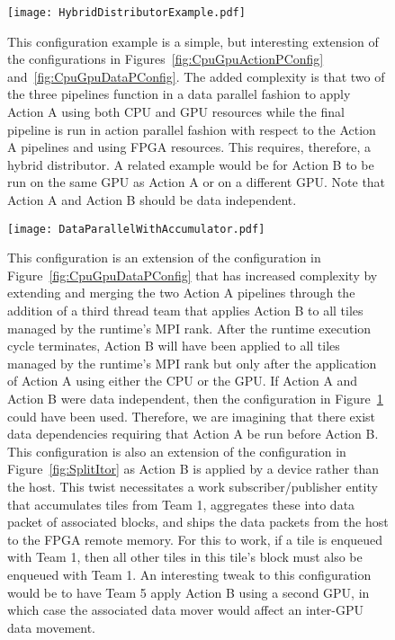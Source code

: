 \documentclass{article}
\begin{document}
\begin{appendices}
\begin{figure}[!hp]
\begin{center}
\texttt{[image: HybridDistributorExample.pdf]}
\caption[]{This configuration example is a simple, but interesting extension of
the configurations in Figures~\ref{fig:CpuGpuActionPConfig}
and~\ref{fig:CpuGpuDataPConfig}.  The added complexity is that two of the three
pipelines function in a data parallel fashion to apply Action A using both CPU
and GPU resources while the final pipeline is run in action parallel fashion
with respect to the Action A pipelines and using FPGA resources.   This requires,
therefore, a hybrid distributor.  A related example would be for Action B to be
run on the same GPU as Action A or on a different GPU.  Note that Action A and
Action B should be data independent.}
\label{fig:HybridDistributorExample}
\end{center}
\end{figure}

\begin{figure}[!hp]
\begin{center}
\texttt{[image: DataParallelWithAccumulator.pdf]}
\caption[]{This configuration is an extension of the configuration in
Figure~\ref{fig:CpuGpuDataPConfig} that has increased complexity by extending
and merging the two Action A pipelines through the addition of a third thread
team that applies Action B to all tiles managed by the runtime's MPI rank.
After the runtime execution cycle
terminates, Action B will have been applied to all tiles managed by the
runtime's MPI rank but only after the application of Action A using either the CPU
or the GPU.  If Action A and Action B were data independent, then the
configuration in Figure~\ref{fig:HybridDistributorExample}
could have been used.  Therefore, we are imagining that there exist data
dependencies requiring that
Action A be run before Action B.  This configuration is
also an extension of the configuration in Figure~\ref{fig:SplitItor} as Action B
is applied by a device rather than the host.  This twist necessitates a work
subscriber/publisher entity that accumulates tiles from Team 1, aggregates these
into data packet of associated blocks, and ships the data packets from the
host to the FPGA remote memory.  For this to work, if a tile is enqueued with
Team 1, then all other tiles in this tile's block must also be enqueued with
Team 1.  An interesting tweak to this configuration would be to have Team 5
apply Action B using a second GPU, in which case the associated data mover would
affect an inter-GPU data movement.}
\label{fig:DataPWithAcc}
\end{center}
\end{figure}


\end{appendices}
\end{document}
